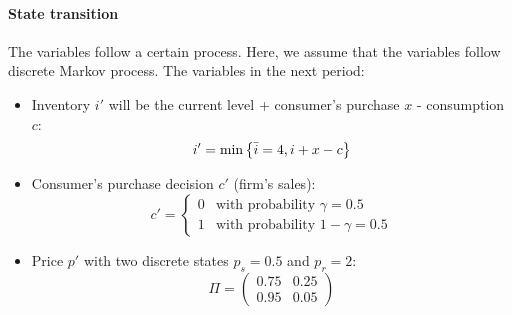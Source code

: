 \documentclass[12pt]{article}[margin=1in]
\begin{document}
\paragraph{State transition} The variables follow a certain process. Here, we assume that the variables
follow discrete Markov process. The variables in the next period:
\begin{itemize}
    \item Inventory $i'$ will be the current level + consumer's purchase $x$ -
          consumption $c$: \begin{equation*}
              i'=\min \left\{\bar{i}=4,i+x-c\right\}
          \end{equation*}
    \item Consumer's purchase decision $c'$ (firm's sales):\begin{equation*}
              c'=\begin{cases}
                  0 & \text{with probability } \gamma = 0.5   \\
                  1 & \text{with probability } 1-\gamma = 0.5
              \end{cases}
          \end{equation*}
    \item Price $p'$ with two discrete states $p_s=0.5$ and $p_r=2$: \begin{equation*}
              \Pi=\begin{pmatrix}
                  0.75 & 0.25 \\
                  0.95 & 0.05
              \end{pmatrix}
          \end{equation*}
\end{itemize}
\end{document}
